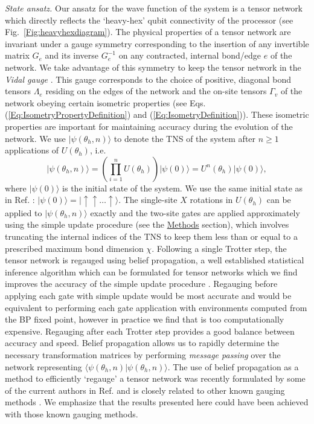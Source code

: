 \documentclass[%
 superscriptaddress,
 amsmath,amssymb,
 prx, nofootinbib,
 twocolumn
]{revtex4-2}
\begin{document}
\emph{State ansatz.} Our ansatz for the wave function of the system is a tensor network which directly reflects the `heavy-hex' qubit connectivity of the processor (see Fig.~\ref{Fig:heavyhexdiagram}). The physical properties of a tensor network are invariant under a gauge symmetry corresponding to the insertion of any invertible matrix $G_{e}$ and its inverse $G_{e}^{-1}$ on any contracted, internal bond/edge $e$ of the network.
We take advantage of this symmetry to keep the tensor network in the \emph{Vidal gauge} \cite{Vidal2003, Jiang2008}. This gauge corresponds to the choice of positive, diagonal bond tensors $\Lambda_{e}$ residing on the edges of the network and the on-site tensors $\Gamma_{v}$ of the network obeying certain isometric properties (see Eqs. (\ref{Eq:IsometryPropertyDefinition}) and (\ref{Eq:IsometryDefinition})). These isometric properties are important for maintaining accuracy during the evolution of the network. We use $\vert \psi(\theta_{h}, n) \rangle$ to denote the TNS of the system after $n \geq 1$ applications of $U(\theta_{h})$, i.e. 
\begin{equation}
    \vert \psi(\theta_{h}, n) \rangle = \left(\prod_{i=1}^{n}U(\theta_{h})\right)\vert \psi(0) \rangle = U^{n}(\theta_{h})\vert \psi(0) \rangle,
    \label{Eq:State}
\end{equation}
where $\vert \psi(0) \rangle$ is the initial state of the system. We use the same initial state as in Ref. \cite{kim2023}: $\vert \psi(0) \rangle = \vert\! \uparrow \uparrow \hdots \uparrow \rangle$.
The single-site $X$ rotations in $U(\theta_{h})$ can be applied to $\vert \psi(\theta_{h}, n) \rangle$ exactly and the two-site gates are applied approximately using the simple update \cite{Jiang2008} procedure (see the \hyperref[Sec:Methods]{Methods} section), which involves truncating the internal indices of the TNS to keep them less than or equal to a prescribed maximum bond dimension $\chi$. 
Following a single Trotter step, the tensor network is regauged using belief propagation, a well established statistical inference algorithm which can  be formulated for tensor networks \cite{TensorNetworkBeliefPropagation2} which we find improves the accuracy of the simple update procedure \cite{Jahromi2019, TindallGauging2023}. Regauging before applying each gate with simple update would be most accurate and would be equivalent to performing each gate application with environments computed from the BP fixed point, however in practice we find that is too computationally expensive. Regauging after each Trotter step provides a good balance between accuracy and speed. Belief propagation allows us to rapidly determine the necessary transformation matrices by performing \emph{message passing} over the network representing $\langle \psi(\theta_{h}, n) \vert \psi(\theta_{h}, n) \rangle$. The use of belief propagation as a method to efficiently `regauge' a tensor network was recently formulated by some of the current authors in Ref. \cite{TindallGauging2023} and is closely related to other known gauging methods  \cite{Ran2012, Phien2015, Jahromi2019, SimpleUpdateGauging3}. We emphasize that the results presented here could have been achieved with those known gauging methods.
\end{document}
